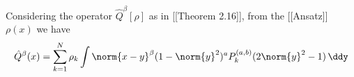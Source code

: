 Considering the operator $\hat{Q}^\beta[\rho]$ as in [[Theorem 2.16]], from the [[Ansatz]] $\rho(x)$ we have
$$\hat{Q}^{\beta}(x) = \sum_{k=1}^{N} \rho_{k} \int \norm{x-y}^{\beta}(1-\norm{y}^2)^{a}P_{k}^{(a, b)}(2\norm{y}^{2}- 1) \,\ddy$$

